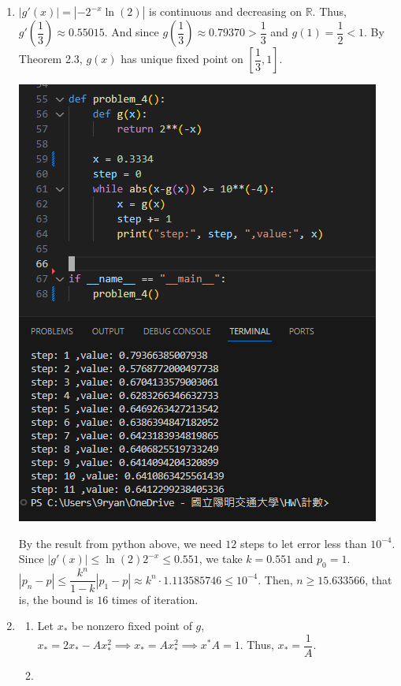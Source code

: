 \documentclass[12pt]{article}
\begin{document}
\begin{enumerate}
    \item $|g'(x)| = |-2^{-x}\ln(2)|$ is continuous and decreasing on $\mathbb{R}$.
    Thus, $g'(\dfrac{1}{3}) \approx 0.55015$.
    And since $g(\dfrac{1}{3})\approx 0.79370 > \dfrac{1}{3}$ and $g(1) = \dfrac{1}{2} < 1$.
    By Theorem 2.3, $g(x)$ has unique fixed point on $[\dfrac{1}{3}, 1]$.

    \includegraphics[scale = 0.8]{2024-03-24-211516.png}

    By the result from python above, we need $12$ steps to let error less than $10^{-4}$.
    Since $|g'(x)| \leq \ln(2)2^{-x} \leq 0.551$, we take $k = 0.551$ and $p_0 = 1$.
    $|p_n - p| \leq \dfrac{k^n}{1-k} |p_1 - p| \approx k^n\cdot 1.113585746 \leq 10^{-4}$.
    Then, $n \geq 15.633566$, that is, the bound is $16$ times of iteration.

    \item \begin{enumerate}
        \item Let $x_*$ be nonzero fixed point of $g$, $x_* = 2x_* - Ax_*^2 \implies x_* = Ax_*^2\implies x^*A = 1$.
        Thus, $x_* = \dfrac{1}{A}$.

        \item 
    \end{enumerate}
\end{enumerate}
\end{document}
